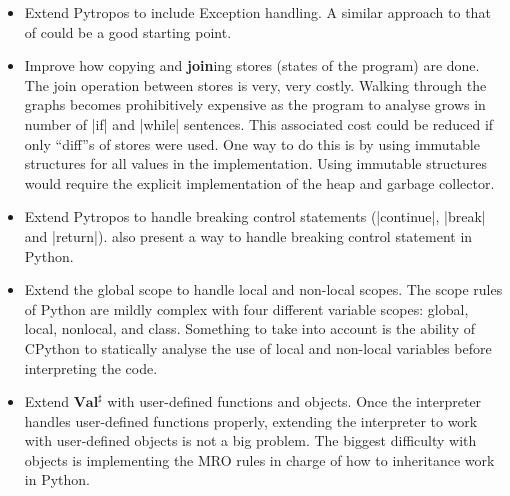 \begin{itemize}
\tightlist
\item Extend Pytropos to include Exception handling. A similar approach to that of
  \textcite{fromherz_static_2018} could be a good starting point.
\item Improve how copying and \textbf{join}ing stores (states of the program) are done.
  The join operation between stores is very, very costly. Walking through the graphs
  becomes prohibitively expensive as the program to analyse grows in number of \pycode|if|
  and \pycode|while| sentences. This associated cost could be reduced if only
  \enquote{diff}s of stores were used. One way to do this is by using immutable
  structures for all values in the implementation. Using immutable structures would
  require the explicit implementation of the heap and garbage collector.
\item Extend Pytropos to handle breaking control statements (\pycode|continue|,
  \pycode|break| and \pycode|return|). \textcite{fromherz_static_2018} also present a way
  to handle breaking control statement in Python.
\item Extend the global scope to handle local and non-local scopes. The scope rules of
  Python are mildly complex with four different variable scopes: global, local, nonlocal,
  and class. Something to take into account is the ability of CPython to statically
  analyse the use of local and non-local variables before interpreting the code.
\item Extend \(\mathbf{Val}^\sharp\) with user-defined functions and objects. Once the
  interpreter handles user-defined functions properly, extending the interpreter to work
  with user-defined objects is not a big problem. The biggest difficulty with
  objects is implementing the MRO rules in charge of how to inheritance work in Python.
\end{itemize}


